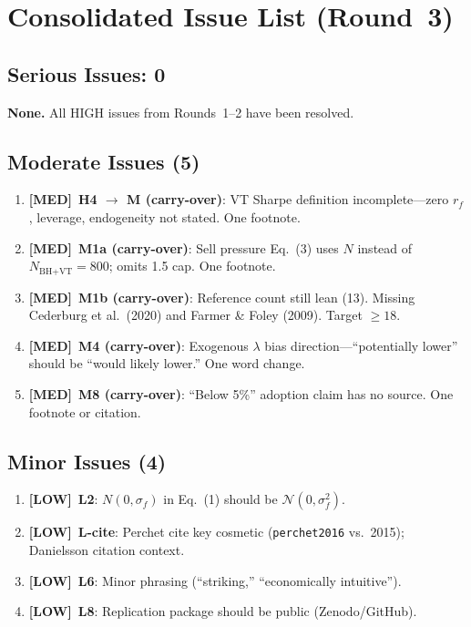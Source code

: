 \documentclass[12pt,a4paper]{article}
\newcommand{\MED}{\textbf{\textcolor{warncolor}{[MED]}}}
\newcommand{\LOW}{\textbf{\textcolor{okgreen}{[LOW]}}}
\begin{document}
\section*{Consolidated Issue List (Round~3)}

\subsection*{\textcolor{errorred}{Serious Issues: 0}}

\noindent\textbf{None.} All HIGH issues from Rounds~1--2 have been resolved.

\subsection*{\textcolor{warncolor}{Moderate Issues (5)}}

\begin{enumerate}
  \item \MED\ \textbf{H4 $\to$ M (carry-over)}: VT Sharpe definition incomplete---zero $r_f$, leverage, endogeneity not stated. One footnote.
  \item \MED\ \textbf{M1a (carry-over)}: Sell pressure Eq.~(3) uses $N$ instead of $N_{\text{BH+VT}} = 800$; omits 1.5 cap. One footnote.
  \item \MED\ \textbf{M1b (carry-over)}: Reference count still lean (13). Missing Cederburg et al.\ (2020) and Farmer \& Foley (2009). Target $\geq 18$.
  \item \MED\ \textbf{M4 (carry-over)}: Exogenous $\lambda$ bias direction---``potentially lower'' should be ``would likely lower.'' One word change.
  \item \MED\ \textbf{M8 (carry-over)}: ``Below 5\%'' adoption claim has no source. One footnote or citation.
\end{enumerate}

\subsection*{Minor Issues (4)}

\begin{enumerate}
  \item \LOW\ \textbf{L2}: $N(0,\sigma_f)$ in Eq.~(1) should be $\mathcal{N}(0,\sigma_f^2)$.
  \item \LOW\ \textbf{L-cite}: Perchet cite key cosmetic (\texttt{perchet2016} vs.\ 2015); Danielsson citation context.
  \item \LOW\ \textbf{L6}: Minor phrasing (``striking,'' ``economically intuitive'').
  \item \LOW\ \textbf{L8}: Replication package should be public (Zenodo/GitHub).
\end{enumerate}
\end{document}
